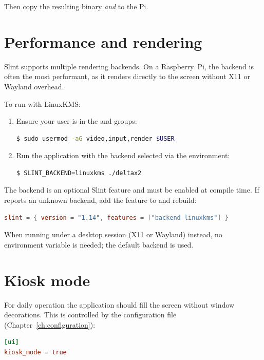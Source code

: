 Then copy the resulting binary \emph{and}  to the Pi.

\section{Performance and rendering}
\label{sec:rendering}

Slint supports multiple rendering backends. On a Raspberry~Pi, the
\textbf{} backend is often the most performant, as it renders
directly to the screen without X11 or Wayland overhead.

To run with LinuxKMS:

\begin{enumerate}[itemsep=2pt]
  \item Ensure your user is in the  and  groups:
\begin{lstlisting}[language=bash]
$ sudo usermod -aG video,input,render $USER
\end{lstlisting}
  \item Run the application with the backend selected via the environment:
\begin{lstlisting}[language=bash]
$ SLINT_BACKEND=linuxkms ./deltax2
\end{lstlisting}
\end{enumerate}

\begin{note}
The  backend is an optional Slint feature and must be enabled at
compile time. If  reports an unknown backend, add the
feature to  and rebuild:
\begin{lstlisting}[language=TOML]
slint = { version = "1.14", features = ["backend-linuxkms"] }
\end{lstlisting}
When running under a desktop session (X11 or Wayland) instead, no environment
variable is needed; the default  backend is used.
\end{note}

\section{Kiosk mode}

For daily operation the application should fill the screen without window
decorations. This is controlled by the configuration file
(Chapter~\ref{ch:configuration}):

\begin{lstlisting}[language=TOML]
[ui]
kiosk_mode = true
\end{lstlisting}

